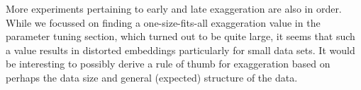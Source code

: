 More experiments pertaining to early and late exaggeration are also in order. While we
focussed on finding a one-size-fits-all exaggeration value in the parameter tuning section,
which turned out to be quite large, it seems that such a value results in distorted embeddings
particularly for small data sets. It would be interesting to possibly derive a rule of thumb
for exaggeration based on perhaps the data size and general (expected) structure of
the data.

